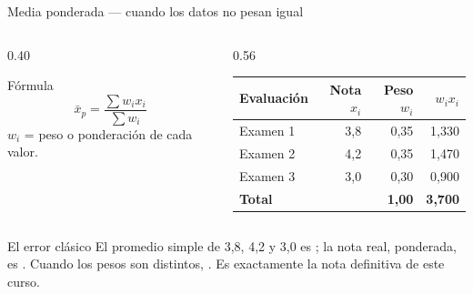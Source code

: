 \documentclass[aspectratio=169,10pt]{beamer}
\begin{document}
\begin{frame}{Media ponderada — cuando los datos no pesan igual}
  \footnotesize
  \begin{columns}[T,onlytextwidth]
    \begin{column}{0.40\textwidth}
      \begin{block}{Fórmula}
        \scriptsize
        \[ \bar{x}_p = \frac{\sum w_i x_i}{\sum w_i} \]
        $w_i$ = peso o ponderación de cada valor.
      \end{block}
    \end{column}
    \begin{column}{0.56\textwidth}
      \centering\scriptsize
      \begin{tabular}{@{}lrrr@{}}
        \toprule
        \textbf{Evaluación} & \textbf{Nota $x_i$} & \textbf{Peso $w_i$} &
        \textbf{$w_i x_i$} \\
        \midrule
        Examen 1 & 3{,}8 & 0{,}35 & 1{,}330 \\
        Examen 2 & 4{,}2 & 0{,}35 & 1{,}470 \\
        Examen 3 & 3{,}0 & 0{,}30 & 0{,}900 \\
        \midrule
        \textbf{Total} & & \textbf{1{,}00} & \textbf{3{,}700} \\
        \bottomrule
      \end{tabular}
    \end{column}
  \end{columns}

  \vspace{0.15cm}
  \begin{alertblock}{El error clásico}
    \scriptsize
    El promedio simple de 3,8, 4,2 y 3,0 es ; la nota real,
    ponderada, es . Cuando los pesos son distintos,
    . Es exactamente la
    nota definitiva de este curso.
  \end{alertblock}
\end{frame}
\end{document}
